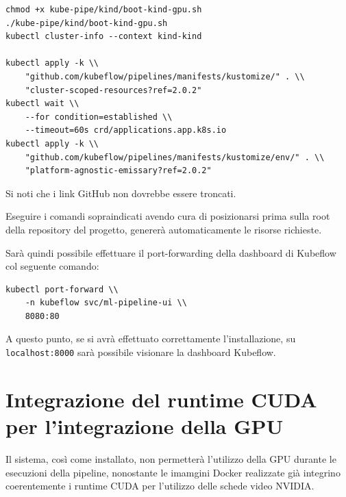 \begin{small}
\begin{Verbatim}[commandchars=\\\{\}]
chmod +x kube-pipe/kind/boot-kind-gpu.sh
./kube-pipe/kind/boot-kind-gpu.sh
kubectl cluster-info --context kind-kind

kubectl apply -k \\ 
    "github.com/kubeflow/pipelines/manifests/kustomize/" . \\
    "cluster-scoped-resources?ref=2.0.2"
kubectl wait \\
    --for condition=established \\ 
    --timeout=60s crd/applications.app.k8s.io
kubectl apply -k \\ 
    "github.com/kubeflow/pipelines/manifests/kustomize/env/" . \\
    "platform-agnostic-emissary?ref=2.0.2"
\end{Verbatim}
\end{small}

Si noti che i link GitHub non dovrebbe essere troncati.

Eseguire i comandi sopraindicati avendo cura di posizionarsi prima sulla root della repository del progetto, genererà automaticamente le risorse richieste.

Sarà quindi possibile effettuare il port-forwarding della dashboard di Kubeflow col seguente comando:

\begin{small}
\begin{Verbatim}[commandchars=\\\{\}]
kubectl port-forward \\ 
    -n kubeflow svc/ml-pipeline-ui \\ 
    8080:80
\end{Verbatim}
\end{small}

A questo punto, se si avrà effettuato correttamente l'installazione, su {\small \verb|localhost:8000|} sarà possibile visionare la dashboard Kubeflow.


\section{Integrazione del runtime CUDA per l'integrazione della GPU}

Il sistema, così come installato, non permetterà l'utilizzo della GPU durante le esecuzioni della pipeline, nonostante le imamgini Docker realizzate già integrino coerentemente i runtime CUDA per l'utilizzo delle schede video NVIDIA.

